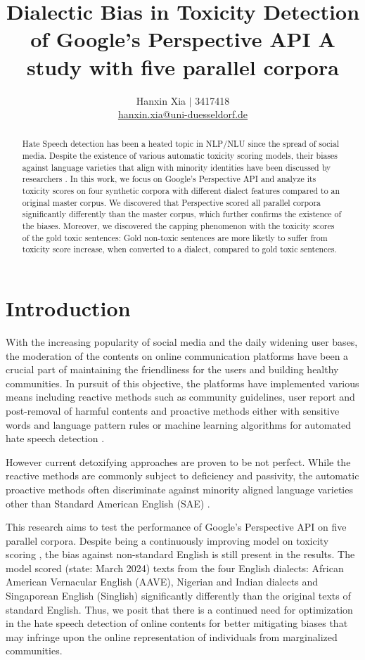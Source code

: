 \documentclass[11pt]{article}
\title{Dialectic Bias in Toxicity Detection of Google's Perspective API
\bigbreak A study with five parallel corpora}
\author{Hanxin Xia $\vert$ 3417418\\
  \href{mailto://hanxin.xia@uni-duesseldorf.de}{hanxin.xia@uni-duesseldorf.de}}
\begin{document}
\maketitle

\begin{abstract}
Hate Speech detection has been a heated topic in NLP/NLU since the spread of social media. Despite the existence of various automatic toxicity scoring models, their biases against language varieties that align with minority identities have been discussed by researchers \citep{sap-etal-2019-risk}. In this work, we focus on Google's Perspective API and analyze its toxicity scores on four synthetic corpora with different dialect features compared to an original master corpus. We discovered that Perspective scored all parallel corpora significantly differently than the master corpus, which further confirms the existence of the biases. Moreover, we discovered the capping phenomenon with the toxicity scores of the gold toxic sentences: Gold non-toxic sentences are more liketly to suffer from toxicity score increase, when converted to a dialect, compared to gold toxic sentences.
\end{abstract}


\section{Introduction}

With the increasing popularity of social media and the daily widening user bases, the moderation of the contents on online communication platforms have been a crucial part of maintaining the friendliness for the users and building healthy communities. In pursuit of this objective, the platforms have implemented various means including reactive methods such as community guidelines, user report and post-removal of harmful contents and proactive methods either with sensitive words and language pattern rules \citep{gitari-2015-lexicon} or machine learning algorithms for automated hate speech detection \citep{alrehili-2019-survey}.

However current detoxifying approaches are proven to be not perfect. While the reactive methods are commonly subject to deficiency and passivity, the automatic proactive methods often discriminate against minority aligned language varieties other than Standard American English (SAE) \citep{sap-etal-2019-risk, zhou-etal-2021-challenges}.

This research aims to test the performance of Google’s Perspective API on five parallel corpora. Despite being a continuously improving model on toxicity scoring \citep{google-perspective}, the bias against non-standard English is still present in the results. The model scored (state: March 2024) texts from the four English dialects: African American Vernacular English (AAVE), Nigerian and Indian dialects and Singaporean English (Singlish) significantly differently than the original texts of standard English. Thus, we posit that there is a continued need for optimization in the hate speech detection of online contents for better mitigating biases that may infringe upon the online representation of individuals from marginalized communities.
\end{document}
